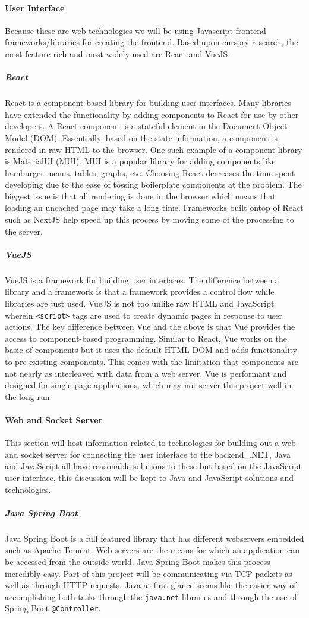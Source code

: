 \paragraph{User Interface}
Because these are web technologies we will be using Javascript frontend frameworks/libraries for creating the frontend. Based upon cursory research, the most feature-rich and most widely used are React and VueJS.
\subparagraph{React}
React is a component-based library for building user interfaces.  Many libraries have extended the functionality by adding components to React for use by other developers. A React component is a stateful element in the Document Object Model (DOM). Essentially, based on the state information, a component is rendered in raw HTML to the browser. One such example of a component library is MaterialUI (MUI). MUI is a popular library for adding components like hamburger menus, tables, graphs, etc. Choosing React decreases the time spent developing due to the ease of tossing boilerplate components at the problem. The biggest issue is that all rendering is done in the browser which means that loading an uncached page may take a long time. Frameworks built ontop of React such as NextJS help speed up this process by moving some of the processing to the server.
\subparagraph{VueJS}
VueJS is a framework for building user interfaces. The difference between a library and a framework is that a framework provides a control flow while libraries are just used. VueJS is not too unlike raw HTML and JavaScript wherein \verb|<script>| tags are used to create dynamic pages in response to user actions. The key difference between Vue and the above is that Vue provides the access to component-based programming. Similar to React, Vue works on the basic of components but it uses the default HTML DOM and adds functionality to pre-existing components. This comes with the limitation that components are not nearly as interleaved with data from a web server. Vue is performant and designed for single-page applications, which may not server this project well in the long-run.
\paragraph{Web and Socket Server}
This section will host information related to technologies for building out a web and socket server for connecting the user interface to the backend. .NET, Java and JavaScript all have reasonable solutions to these but based on the JavaScript user interface, this discussion will be kept to Java and JavaScript solutions and technologies.
\subparagraph{Java Spring Boot}
Java Spring Boot is a full featured library that has different webservers embedded such as Apache Tomcat. Web servers are the means for which an application can be accessed from the outside world. Java Spring Boot makes this process incredibly easy. Part of this project will be communicating via TCP packets as well as through HTTP requests. Java at first glance seems like the easier way of accomplishing both tasks through the \verb|java.net| libraries and through the use of Spring Boot \verb|@Controller|.

